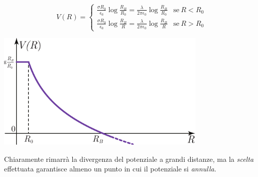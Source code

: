 \begin{equation}
	V(R)=
	\begin{cases}
		\frac{\sigma R_0}{\epsilon_0}\log \frac{R_B}{R_0}=\frac{\lambda}{2\pi\epsilon_0}\log \frac{R_B}{R_0}&\text{se}\ R< R_0\\
		\frac{\sigma R_0}{\epsilon_0}\log \frac{R_B}{R}=\frac{\lambda}{2\pi\epsilon_0}\log \frac{R_B}{R}&\text{se}\ R> R_0
	\end{cases}
\end{equation}
\begin{center}
	\includegraphics[width=0.75\textwidth]{images/chp3cilindrograf2.pdf}
\end{center}
Chiaramente rimarrà la divergenza del potenziale a grandi distanze, ma la \textit{scelta} effettuata garantisce almeno un punto in cui il potenziale si \textit{annulla}.
